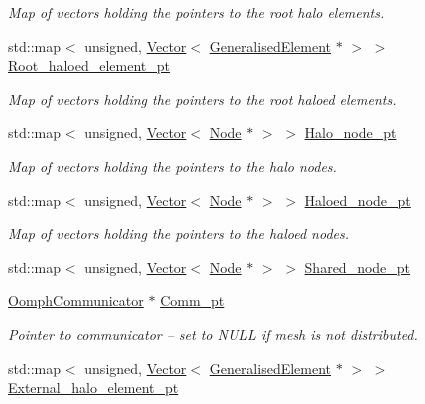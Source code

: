 \begin{DoxyCompactItemize}
\begin{DoxyCompactList}\small\item\em Map of vectors holding the pointers to the root halo elements. \end{DoxyCompactList}\item 
std\+::map$<$ unsigned, \hyperlink{classoomph_1_1Vector}{Vector}$<$ \hyperlink{classoomph_1_1GeneralisedElement}{Generalised\+Element} $\ast$ $>$ $>$ \hyperlink{classoomph_1_1Mesh_a205ef660e5763d553053075a254db2a7}{Root\+\_\+haloed\+\_\+element\+\_\+pt}
\begin{DoxyCompactList}\small\item\em Map of vectors holding the pointers to the root haloed elements. \end{DoxyCompactList}\item 
std\+::map$<$ unsigned, \hyperlink{classoomph_1_1Vector}{Vector}$<$ \hyperlink{classoomph_1_1Node}{Node} $\ast$ $>$ $>$ \hyperlink{classoomph_1_1Mesh_aa36c21b9e32a318c4b043aea2411cdac}{Halo\+\_\+node\+\_\+pt}
\begin{DoxyCompactList}\small\item\em Map of vectors holding the pointers to the halo nodes. \end{DoxyCompactList}\item 
std\+::map$<$ unsigned, \hyperlink{classoomph_1_1Vector}{Vector}$<$ \hyperlink{classoomph_1_1Node}{Node} $\ast$ $>$ $>$ \hyperlink{classoomph_1_1Mesh_ab05a3c50d404474a00996a0c9a0e1da8}{Haloed\+\_\+node\+\_\+pt}
\begin{DoxyCompactList}\small\item\em Map of vectors holding the pointers to the haloed nodes. \end{DoxyCompactList}\item 
std\+::map$<$ unsigned, \hyperlink{classoomph_1_1Vector}{Vector}$<$ \hyperlink{classoomph_1_1Node}{Node} $\ast$ $>$ $>$ \hyperlink{classoomph_1_1Mesh_a0fba80dc38b8577982b94309e4e1d3d7}{Shared\+\_\+node\+\_\+pt}
\item 
\hyperlink{classoomph_1_1OomphCommunicator}{Oomph\+Communicator} $\ast$ \hyperlink{classoomph_1_1Mesh_a775158642d3320e0d709bcccd790875f}{Comm\+\_\+pt}
\begin{DoxyCompactList}\small\item\em Pointer to communicator -- set to N\+U\+LL if mesh is not distributed. \end{DoxyCompactList}\item 
std\+::map$<$ unsigned, \hyperlink{classoomph_1_1Vector}{Vector}$<$ \hyperlink{classoomph_1_1GeneralisedElement}{Generalised\+Element} $\ast$ $>$ $>$ \hyperlink{classoomph_1_1Mesh_afb2def03c6259295dbd65303584edf31}{External\+\_\+halo\+\_\+element\+\_\+pt}

\end{DoxyCompactItemize}
